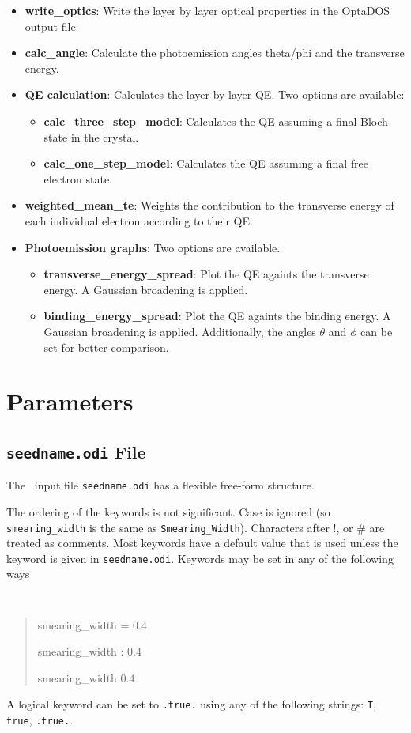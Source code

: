 \documentclass[a4paper,11pt,twoside]{book}
\begin{document}
\begin{itemize}
\item  {\bf write\_optics}: Write the layer by layer optical properties in the OptaDOS output file.

\item  {\bf calc\_angle}: Calculate the photoemission angles theta/phi and the transverse energy.

\item  {\bf QE calculation}: Calculates the layer-by-layer QE.
    Two options are available:
	\begin{itemize}
	\item {\bf calc\_three\_step\_model}: Calculates the QE assuming a final Bloch state in the crystal.
	\item {\bf calc\_one\_step\_model}: Calculates the QE assuming a final free electron state.

        \end{itemize}
\item  {\bf weighted\_mean\_te}: Weights the contribution to the transverse energy of each individual electron according to their QE.

\item  {\bf Photoemission graphs}: Two options are available.
	\begin{itemize}
	\item {\bf transverse\_energy\_spread}: Plot the QE againts the transverse energy. A Gaussian broadening is applied.
	\item {\bf binding\_energy\_spread}: Plot the QE againts the binding energy. A Gaussian broadening is applied. Additionally, the angles $\theta$ and $\phi$ can be set for better comparison.
        \end{itemize}

\end{itemize}

\chapter{Parameters}\label{chap:parameters}

\section{{\tt seedname.odi} File}
The \optados\ input file {\tt seedname.odi} has a flexible free-form
structure.

The ordering of the keywords is not significant. Case is ignored (so
\verb#smearing_width# is the same as \verb#Smearing_Width#). Characters after !, or \#
are treated as comments. Most keywords have a default value that is
used unless the keyword is given in {\tt seedname.odi}. Keywords may be set
in any of the following ways
{\tt
\begin{quote}
smearing\_width = 0.4

smearing\_width : 0.4

smearing\_width   0.4
\end{quote} }
A logical keyword can be set to {\tt .true.} using any of the following
strings: {\tt T}, {\tt true}, {\tt .true.}.
\end{document}
